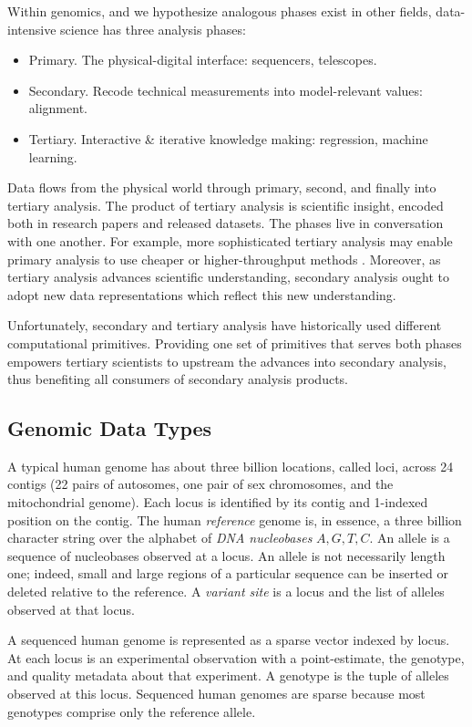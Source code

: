 \documentclass[10pt,a4paper%
]{article}
\begin{document}
Within genomics, and we hypothesize analogous phases exist in other fields, data-intensive science
has three analysis phases:

\begin{itemize}
\item Primary. The physical-digital interface: sequencers, telescopes.
\item Secondary. Recode technical measurements into model-relevant values: alignment.
\item Tertiary. Interactive \& iterative knowledge making: regression, machine learning.
\end{itemize}

Data flows from the physical world through primary, second, and finally into tertiary analysis. The
product of tertiary analysis is scientific insight, encoded both in research papers and released
datasets. The phases live in conversation with one another. For example, more sophisticated tertiary
analysis may enable primary analysis to use cheaper or higher-throughput methods
\cite{bge}. Moreover, as tertiary analysis advances scientific understanding, secondary analysis
ought to adopt new data representations which reflect this new understanding.

Unfortunately, secondary and tertiary analysis have historically used different computational
primitives. Providing one set of primitives that serves both phases empowers tertiary scientists to
upstream the advances into secondary analysis, thus benefiting all consumers of secondary analysis
products.

\subsection{Genomic Data Types}

A typical human genome has about three billion locations, called loci, across 24 contigs (22 pairs
of autosomes, one pair of sex chromosomes, and the mitochondrial genome). Each locus is identified
by its contig and 1-indexed position on the contig. The human \emph{reference} genome is, in
essence, a three billion character string over the alphabet of \emph{DNA nucleobases} ${A, G, T,
  C}$. An allele is a sequence of nucleobases observed at a locus. An allele is not necessarily
length one; indeed, small and large regions of a particular sequence can be inserted or deleted
relative to the reference. A \emph{variant site} is a locus and the list of alleles observed at that
locus.

A sequenced human genome is represented as a sparse vector indexed by locus. At each locus is an
experimental observation with a point-estimate, the genotype, and quality metadata about that
experiment. A genotype is the tuple of alleles observed at this locus. Sequenced human genomes are
sparse because most genotypes comprise only the reference allele.
\end{document}
